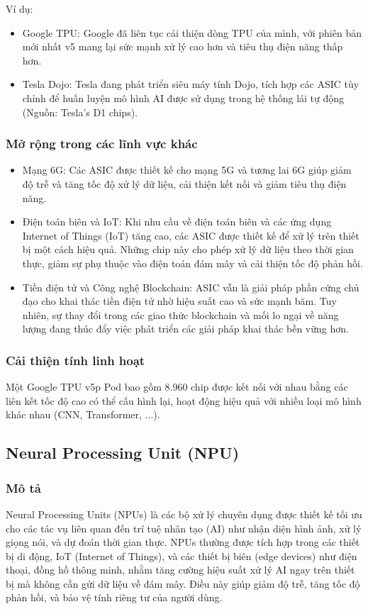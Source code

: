 \documentclass[a4paper]{article}
\begin{document}
Ví dụ:
\begin{itemize}
    \item Google TPU: Google đã liên tục cải thiện dòng TPU của mình, với phiên bản mới nhất v5 mang lại sức mạnh xử lý cao hơn và tiêu thụ điện năng thấp hơn.  
    \item Tesla Dojo: Tesla đang phát triển siêu máy tính Dojo, tích hợp các ASIC tùy chỉnh để huấn luyện mô hình AI được sử dụng trong hệ thống lái tự động (Nguồn: Tesla’s D1 chips).
\end{itemize}
\subsubsection{Mở rộng trong các lĩnh vực khác}
\begin{itemize}
    \item Mạng 6G: Các ASIC được thiết kế cho mạng 5G và tương lai 6G giúp giảm độ trễ và tăng tốc độ xử lý dữ liệu, cải thiện kết nối và giảm tiêu thụ điện năng.  
    \item Điện toán biên và IoT: Khi nhu cầu về điện toán biên và các ứng dụng Internet of Things (IoT) tăng cao, các ASIC được thiết kế để xử lý trên thiết bị một cách hiệu quả. Những chip này cho phép xử lý dữ liệu theo thời gian thực, giảm sự phụ thuộc vào điện toán đám mây và cải thiện tốc độ phản hồi.  
    \item Tiền điện tử và Công nghệ Blockchain: ASIC vẫn là giải pháp phần cứng chủ đạo cho khai thác tiền điện tử nhờ hiệu suất cao và sức mạnh băm. Tuy nhiên, sự thay đổi trong các giao thức blockchain và mối lo ngại về năng lượng đang thúc đẩy việc phát triển các giải pháp khai thác bền vững hơn.
\end{itemize}
\subsubsection{Cải thiện tính linh hoạt}
Một Google TPU v5p Pod bao gồm 8.960 chip được kết nối với nhau bằng các liên kết tốc độ cao có thể cấu hình lại, hoạt động hiệu quả với nhiều loại mô hình khác nhau (CNN, Transformer, ...).

\subsection{Neural Processing Unit (NPU)}
\subsubsection{Mô tả}
Neural Processing Units (NPUs) là các bộ xử lý chuyên dụng được thiết kế tối ưu cho các tác vụ liên quan đến trí tuệ nhân tạo (AI) như nhận diện hình ảnh, xử lý giọng nói, và dự đoán thời gian thực. NPUs thường được tích hợp trong các thiết bị di động, IoT (Internet of Things), và các thiết bị biên (edge devices) như điện thoại, đồng hồ thông minh, nhằm tăng cường hiệu suất xử lý AI ngay trên thiết bị mà không cần gửi dữ liệu về đám mây. Điều này giúp giảm độ trễ, tăng tốc độ phản hồi, và bảo vệ tính riêng tư của người dùng.
\end{document}
